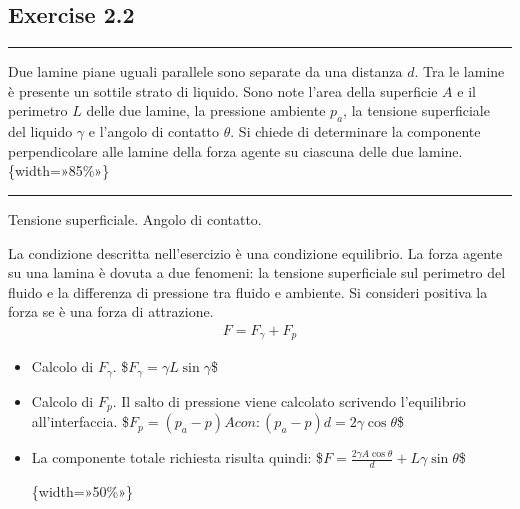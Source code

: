 \documentclass[letterpaper,10pt,italian]{jupyterBook}
\begin{document}
\sphinxstepscope


\subsection{Exercise 2.2}
\label{\detokenize{polimi/fluidmechanics-ita/template/capitoli/02_tensSup/0302in:exercise-2-2}}\label{\detokenize{polimi/fluidmechanics-ita/template/capitoli/02_tensSup/0302in:fluid-mechanics-surface-tension-ex-02}}\label{\detokenize{polimi/fluidmechanics-ita/template/capitoli/02_tensSup/0302in::doc}}

\bigskip\hrule\bigskip


\sphinxAtStartPar
Due lamine piane uguali parallele sono separate da una distanza \(d\). Tra le lamine è presente un sottile strato di liquido. Sono note l’area della superficie \(A\) e il perimetro \(L\) delle due lamine, la pressione ambiente \(p_a\), la tensione superficiale del liquido \(\gamma\) e l’angolo di contatto \(\theta\). Si chiede di determinare la componente perpendicolare alle lamine della forza agente su ciascuna delle due lamine.   \{width=»85\%»\}


\bigskip\hrule\bigskip


\sphinxAtStartPar
Tensione superficiale. Angolo di contatto.

\sphinxAtStartPar
La condizione descritta nell’esercizio è una condizione equilibrio. La
forza agente su una lamina è dovuta a due fenomeni: la tensione
superficiale sul perimetro del fluido e la differenza di pressione tra
fluido e ambiente. Si consideri positiva la forza se è una forza di
attrazione.
\begin{equation*}
\begin{split}F = F_\gamma + F_p\end{split}
\end{equation*}\begin{itemize}
\item {} 
\sphinxAtStartPar
Calcolo di \(F_\gamma\). \$\(F_\gamma = \gamma L \sin\gamma\)\$

\item {} 
\sphinxAtStartPar
Calcolo di \(F_p\). Il salto di pressione viene calcolato scrivendo
l’equilibrio all’interfaccia. \$\(F_p = (p_a - p) A\)\( con:
\)\((p_a - p) d = 2 \gamma \cos \theta\)\$

\item {} 
\sphinxAtStartPar
La componente totale richiesta risulta quindi:
\$\(F = \frac{2 \gamma A \cos \theta}{d} + L \gamma \sin \theta\)\$

\sphinxAtStartPar
{}\{width=»50\%»\}

\end{itemize}
\end{document}
